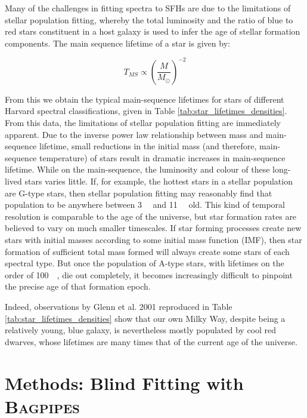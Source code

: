 \documentclass[a4paper,12pt]{article}
\begin{document}
Many of the challenges in fitting spectra to SFHs are due to the limitations of
stellar population fitting, whereby the total luminosity and the ratio of blue
to red stars constituent in a host galaxy is used to infer the age of stellar
formation components. The main sequence lifetime of a star is given
by\cite{Prialnik_2010}:

\begin{equation}
  T_{MS} \propto \left(\frac{M}{M_\odot}\right)^{-2}
\end{equation}

\noindent From this we obtain the typical main-sequence lifetimes for stars of
different Harvard spectral classifications, given in Table
\ref{tab:star_lifetimes_densities}. From this data, the limitations of stellar
population fitting are immediately apparent. Due to the inverse power law
relationship between mass and main-sequence lifetime, small reductions in the
initial mass (and therefore, main-sequence temperature) of stars result in
dramatic increases in main-sequence lifetime. While on the main-sequence, the
luminosity and colour of these long-lived stars varies
little.\cite{Prialnik_2010} If, for example, the hottest stars in a stellar
population are G-type stars, then stellar population fitting may reasonably
find that population to be anywhere between \SI{3}{\giga\year} and
\SI{11}{\giga\year} old. This kind of temporal resolution is comparable to the
age of the universe, but star formation rates are believed to vary on much
smaller timescales.\cite{Kauffmann_2003c} If star forming processes create new
stars with initial masses according to some initial mass function (IMF), then
star formation of sufficient total mass formed will always create some stars of
each spectral type. But once the population of A-type stars, with lifetimes on
the order of \SI{100}{\mega\year}, die out completely, it becomes increasingly
difficult to pinpoint the precise age of that formation epoch.

Indeed, observations by Glenn et al. 2001 reproduced in Table
\ref{tab:star_lifetimes_densities} show that our own Milky Way, despite being a
relatively young, blue galaxy, is nevertheless mostly populated by cool red
dwarves, whose lifetimes are many times that of the current age of the universe.

\section{Methods: Blind Fitting with \textsc{Bagpipes}}\label{sec:blind_fitting}
\end{document}
